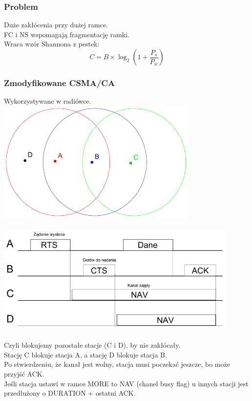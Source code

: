 \documentclass[a4paper,twoside]{article}
\begin{document}
	\subsubsection{Problem}
			Duże zakłócenia przy dużej ramce.\\
			FC i NS wspomagają fragmentację ramki.\\
			Wraca wzór Shannona z pestek:\\
			$$ C=B\times \log_2{(1+\frac{P_s}{P_w})} $$
	\subsubsection{Zmodyfikowane CSMA/CA}
		Wykorzystywane w radiówce.\\
		\includegraphics[width=10cm]{./images/image23.pdf}\\\\
		\includegraphics[width=12cm]{./images/image24.pdf}\\\\
		Czyli blokujemy pozostałe stacje (C i D), by nie zakłócały.\\
		Stację C blokuje stacja A, a stację D blokuje stacja B.\\
		Po stwierdzeniu, że kanał jest wolny, stacja musi poczekać jeszcze, bo może przyjść ACK.\\
		Jeśli stacja ustawi w ramce MORE to NAV (chanel busy flag) u innych stacji jest przedłużony o DURATION + ostatni ACK.
\end{document}
